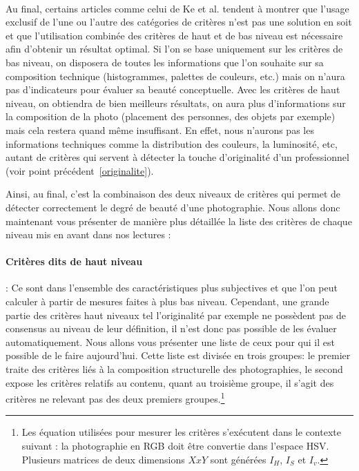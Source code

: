\documentclass[11pt, french]{report-rd-info}
\begin{document}
\paragraph*{}
Au final, certains articles comme celui de Ke et al. tendent à montrer que l'usage exclusif de l'une ou l'autre des catégories de critères n’est pas une solution en soit et que l’utilisation combinée des critères de haut et de bas niveau est nécessaire afin d’obtenir un résultat optimal. Si l’on se base uniquement sur les critères de bas niveau, on disposera de toutes les informations que l’on souhaite sur sa composition technique (histogrammes, palettes de couleurs, etc.) mais on n’aura pas d’indicateurs pour évaluer sa beauté conceptuelle. Avec les critères de haut niveau, on obtiendra de bien meilleurs résultats, on aura plus d’informations sur la composition de la photo (placement des personnes, des objets par exemple) mais cela restera quand même insuffisant. En effet, nous n’aurons pas les informations techniques comme la distribution des couleurs, la luminosité, etc, autant de critères qui servent à détecter la touche d’originalité d’un professionnel (voir point précédent~\ref{originalite}).

Ainsi, au final, c’est la combinaison des deux niveaux de critères qui permet de détecter correctement le degré de beauté d’une photographie.
Nous allons donc maintenant vous présenter de manière plus détaillée la liste des critères de chaque niveau mis en avant dans nos lectures :
\paragraph{Critères dits de haut niveau} : Ce sont dans l'ensemble des caractéristiques plus subjectives et que l'on peut calculer à partir de mesures faites à plus bas niveau. Cependant, une grande partie des critères haut niveaux tel l’originalité par exemple ne possèdent pas de consensus au niveau de leur définition, il n’est donc pas possible de les évaluer automatiquement. Nous allons vous présenter une liste de ceux pour qui il est possible de le faire aujourd'hui. Cette liste est divisée en trois groupes: le premier traite des critères liés à la composition structurelle des photographies, le second expose les critères relatifs au contenu, quant au troisième groupe, il s'agit des critères ne relevant pas des deux premiers groupes.\footnote{Les équation utilisées pour mesurer les critères s'exécutent dans le contexte suivant : la photographie en RGB doit être convertie dans l'espace HSV. Plusieurs matrices de deux dimensions $X x Y$ sont générées $I_H$, $I_S$ et $I_v$.}
\end{document}
